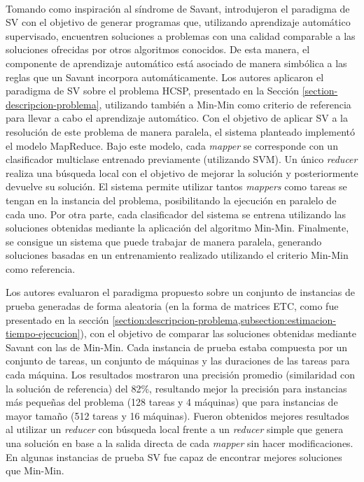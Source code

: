 \paragraph{}Tomando como inspiración al síndrome de Savant, \citet{savant-original} introdujeron el paradigma de SV con el objetivo de generar programas que, utilizando aprendizaje automático supervisado, encuentren soluciones a problemas con una calidad comparable a las soluciones ofrecidas por otros algoritmos conocidos.
De esta manera, el componente de aprendizaje automático está asociado de manera simbólica a las reglas que un Savant incorpora automáticamente.
Los autores aplicaron el paradigma de SV sobre el problema HCSP, presentado en la Sección \ref{section-descripcion-problema}, utilizando también a Min-Min como criterio de referencia para llevar a cabo el aprendizaje automático.
Con el objetivo de aplicar SV a la resolución de este problema de manera paralela, el sistema planteado implementó el modelo MapReduce.
Bajo este modelo, cada \textit{mapper} se corresponde con un clasificador multiclase entrenado previamente (utilizando SVM). Un único \textit{reducer} realiza una búsqueda local con el objetivo de mejorar la solución y posteriormente devuelve su solución.
El sistema permite utilizar tantos \textit{mappers} como tareas se tengan en la instancia del problema, posibilitando la ejecución en paralelo de cada uno.
Por otra parte, cada clasificador del sistema se entrena utilizando las soluciones obtenidas mediante la aplicación del algoritmo Min-Min.
Finalmente, se consigue un sistema que puede trabajar de manera paralela, generando soluciones basadas en un entrenamiento realizado utilizando el criterio Min-Min como referencia. 

Los autores evaluaron el paradigma propuesto sobre un conjunto de instancias de prueba generadas de forma aleatoria (en la forma de matrices ETC, como fue presentado en la sección \ref{section:descripcion-problema,subsection:estimacion-tiempo-ejecucion}), con el objetivo de comparar las soluciones obtenidas mediante Savant con las de Min-Min.
Cada instancia de prueba estaba compuesta por un conjunto de tareas, un conjunto de máquinas y las duraciones de las tareas para cada máquina. 
Los resultados mostraron una precisión promedio (similaridad con la solución de referencia) del 82\%, resultando mejor la precisión para instancias más pequeñas del problema (128 tareas y 4 máquinas) que para instancias de mayor tamaño (512 tareas y 16 máquinas). 
Fueron obtenidos mejores resultados al utilizar un \textit{reducer} con búsqueda local frente a un \textit{reducer} simple que genera una solución en base a la salida directa de cada \textit{mapper} sin hacer modificaciones.
En algunas instancias de prueba SV fue capaz de encontrar mejores soluciones que Min-Min. 

